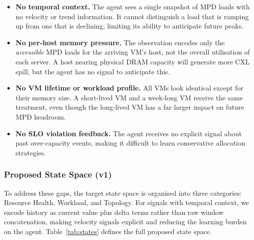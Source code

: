\documentclass[11pt]{article}
\begin{document}
\begin{itemize}
    \item \textbf{No temporal context.}  The agent sees a single snapshot
          of MPD loads with no velocity or trend information.  It cannot
          distinguish a load that is ramping up from one that is declining,
          limiting its ability to anticipate future peaks.
    \item \textbf{No per-host memory pressure.}  The observation encodes
          only the \emph{accessible} MPD loads for the arriving VM's host,
          not the overall utilisation of each server.  A host nearing
          physical DRAM capacity will generate more CXL spill, but the agent
          has no signal to anticipate this.
    \item \textbf{No VM lifetime or workload profile.}  All VMs look
          identical except for their memory size.  A short-lived VM and a
          week-long VM receive the same treatment, even though the long-lived
          VM has a far larger impact on future MPD headroom.
    \item \textbf{No SLO violation feedback.}  The agent receives no
          explicit signal about past over-capacity events, making it
          difficult to learn conservative allocation strategies.
\end{itemize}

\subsubsection*{Proposed State Space (v1)}

To address these gaps, the target state space is organised into three
categories: Resource Health, Workload, and Topology.
For signals with temporal context, we encode history as current value plus
delta terms rather than raw window concatenation, making velocity signals
explicit and reducing the learning burden on the agent.
Table~\ref{tab:states} defines the full proposed state space.
\end{document}
